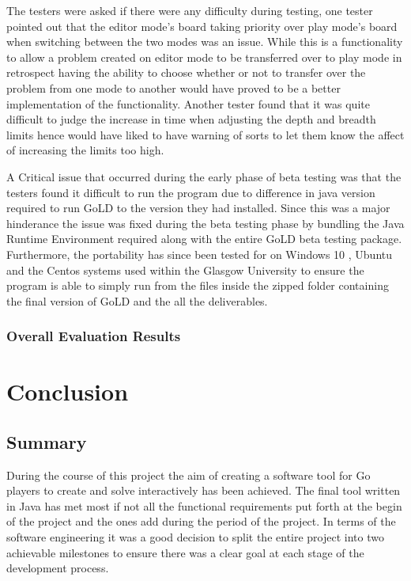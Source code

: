 \documentclass{l4proj}
\begin{document}
The testers were asked if there were any difficulty during testing, one tester pointed out that the editor mode’s board taking priority over play mode’s board when switching between the two modes was an issue. While this is a functionality to allow a problem created on editor mode to be transferred over to play mode in retrospect having the ability to choose whether or not to transfer over the problem from one mode to another would have proved to be a better implementation of the functionality. Another tester found that it was quite difficult to judge the increase in time when adjusting the depth and breadth limits hence would have liked to have warning of sorts to let them know the affect of increasing the limits too high.

A Critical issue that occurred during the early phase of beta testing was that the testers found it difficult to run the program due to difference in java version required to run GoLD to the version they had installed. Since this was a major hinderance the issue was fixed during the beta testing phase by bundling the Java Runtime Environment required along with the entire GoLD beta testing package. Furthermore, the portability has since been tested for on Windows 10 , Ubuntu and the Centos systems used within the Glasgow University to ensure the program is able to simply run from the files inside the zipped folder containing the final version of GoLD and the all the deliverables.

\subsection{Overall Evaluation Results}




\chapter{Conclusion}

\section{Summary}
During the course of this project the aim of creating a software tool for Go players to create and solve interactively has been achieved. The final tool written in Java has met most if not all the functional requirements put forth at the begin of the project and the ones add during the period of the project. In terms of the software engineering it was a good decision to split the entire project into two achievable milestones to ensure there was a clear goal at each stage of the development process.
\end{document}
